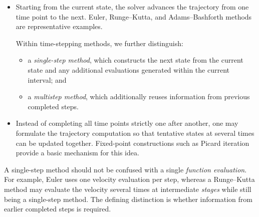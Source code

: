 \begin{itemize}
    \item {}
    Starting from the current state, the solver advances the trajectory from
    one time point to the next. Euler, Runge--Kutta, and Adams--Bashforth
    methods are representative examples.

    Within time-stepping methods, we further distinguish:
    \begin{itemize}
        \item a \emph{single-step method}, which constructs the next state
        from the current state and any additional evaluations generated
        within the current interval; and

        \item a \emph{multistep method}, which additionally reuses
        information from previous completed steps.
    \end{itemize}

    \item {}
    Instead of completing all time points strictly one after another, one may
    formulate the trajectory computation so that tentative states at several
    times can be updated together. Fixed-point constructions such as Picard
    iteration provide a basic mechanism for this idea.
\end{itemize}

A single-step method should not be confused with a single
\emph{function evaluation}. For example, Euler uses one velocity evaluation
per step, whereas a Runge--Kutta method may evaluate the velocity several
times at intermediate \emph{stages} while still being a single-step method.
The defining distinction is whether information from earlier completed steps
is required.


